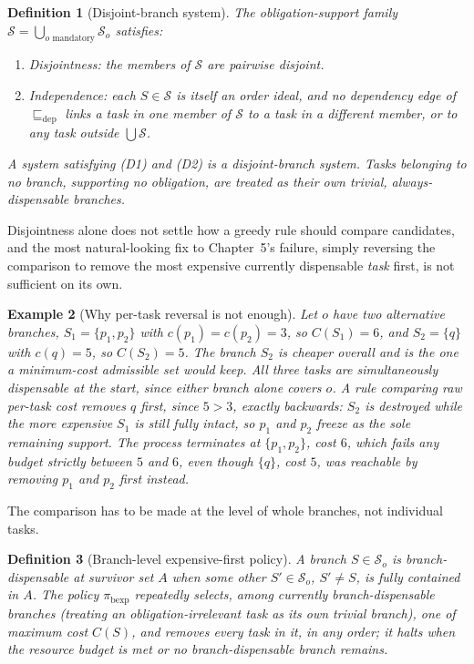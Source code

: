 \documentclass[11pt]{report}
\newtheorem{definition}{Definition}[chapter]
\newtheorem{example}[definition]{Example}
\begin{document}
\begin{definition}[Disjoint-branch system]
The obligation-support family $\mathcal S = \bigcup_{o \text{ mandatory}} \mathcal S_o$ satisfies:
\begin{enumerate}[label=(D\arabic*)]
\item \emph{Disjointness}: the members of $\mathcal S$ are pairwise disjoint.
\item \emph{Independence}: each $S \in \mathcal S$ is itself an order ideal, and no dependency edge of $\sqsubseteq_{\mathrm{dep}}$ links a task in one member of $\mathcal S$ to a task in a different member, or to any task outside $\bigcup \mathcal S$.
\end{enumerate}
A system satisfying (D1) and (D2) is a disjoint-branch system. Tasks belonging to no branch, supporting no obligation, are treated as their own trivial, always-dispensable branches.
\end{definition}

Disjointness alone does not settle how a greedy rule should compare candidates, and the most natural-looking fix to Chapter~5's failure, simply reversing the comparison to remove the most expensive currently dispensable \emph{task} first, is not sufficient on its own.

\begin{example}[Why per-task reversal is not enough]
\label{ex:granularity}
Let $o$ have two alternative branches, $S_1 = \{p_1, p_2\}$ with $c(p_1) = c(p_2) = 3$, so $C(S_1) = 6$, and $S_2 = \{q\}$ with $c(q) = 5$, so $C(S_2) = 5$. The branch $S_2$ is cheaper overall and is the one a minimum-cost admissible set would keep. All three tasks are simultaneously dispensable at the start, since either branch alone covers $o$. A rule comparing raw per-task cost removes $q$ first, since $5 > 3$, exactly backwards: $S_2$ is destroyed while the more expensive $S_1$ is still fully intact, so $p_1$ and $p_2$ freeze as the sole remaining support. The process terminates at $\{p_1, p_2\}$, cost $6$, which fails any budget strictly between $5$ and $6$, even though $\{q\}$, cost $5$, was reachable by removing $p_1$ and $p_2$ first instead.
\end{example}

The comparison has to be made at the level of whole branches, not individual tasks.

\begin{definition}[Branch-level expensive-first policy]
A branch $S \in \mathcal S_o$ is branch-dispensable at survivor set $A$ when some other $S' \in \mathcal S_o$, $S' \ne S$, is fully contained in $A$. The policy $\pi_{\mathrm{bexp}}$ repeatedly selects, among currently branch-dispensable branches (treating an obligation-irrelevant task as its own trivial branch), one of maximum cost $C(S)$, and removes every task in it, in any order; it halts when the resource budget is met or no branch-dispensable branch remains.
\end{definition}
\end{document}

